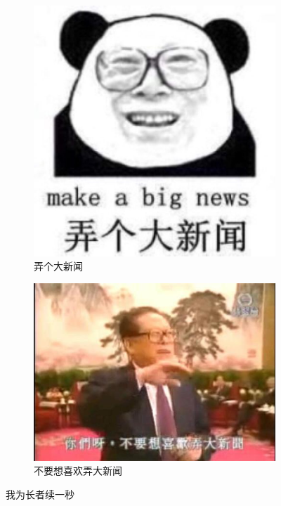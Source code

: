 \begin{figure}[H]
	\centering
	\begin{subfigure}[b]{0.3\textwidth}
		\centering
		\includegraphics[width=.15\textheight]{images/make_a_big_news.jpg}
		\caption{弄个大新闻}
	\end{subfigure}
	\begin{subfigure}[b]{0.3\textwidth}
		\centering
		\includegraphics[width=.15\textheight]{images/you_like_big_news.jpg}
		\caption{不要想喜欢弄大新闻}
	\end{subfigure}
	\caption{我为长者续一秒}
\end{figure}

